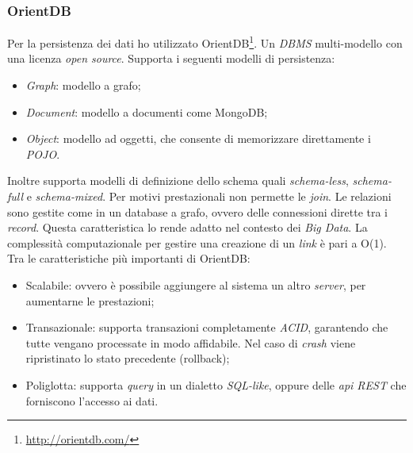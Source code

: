 \subsubsection{OrientDB}
Per la persistenza dei dati ho utilizzato OrientDB\footnote{\url{http://orientdb.com/}}. Un \emph{DBMS} multi-modello con una licenza \emph{open source}. Supporta i seguenti modelli di persistenza:
\begin{itemize}
\item \emph{Graph}: modello a grafo; 
\item \emph{Document}: modello a documenti come MongoDB;
\item \emph{Object}: modello ad oggetti, che consente di memorizzare direttamente i \emph{POJO}.
\end{itemize}
Inoltre supporta modelli di definizione dello schema quali \emph{schema-less}, \emph{schema-full} e \emph{schema-mixed}. Per motivi prestazionali non permette le \emph{join}. Le relazioni sono gestite come in un database a grafo, ovvero delle connessioni dirette tra i \emph{record}. Questa caratteristica lo rende adatto nel contesto dei \emph{Big Data}. La complessità computazionale per gestire una creazione di un \emph{link} è pari a O(1). Tra le caratteristiche più importanti di OrientDB:
\begin{itemize}
\item Scalabile: ovvero è possibile aggiungere al sistema un altro \emph{server}, per aumentarne le prestazioni;
\item Transazionale: supporta transazioni completamente \emph{ACID}, garantendo che tutte vengano processate in modo affidabile. Nel caso di \emph{crash} viene ripristinato lo stato precedente (rollback);
\item Poliglotta: supporta \emph{query} in un dialetto \emph{SQL-like}, oppure delle \emph{\gls{api} REST} che forniscono l'accesso ai dati.
\end{itemize}
